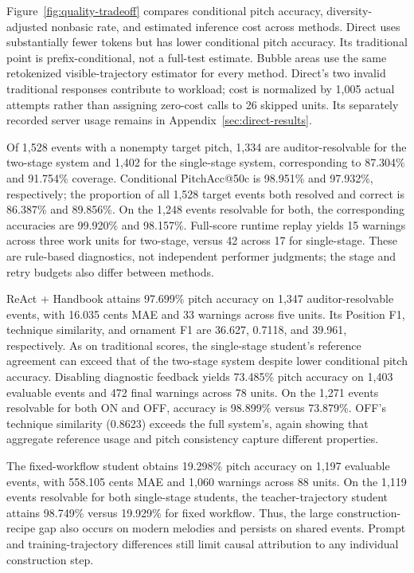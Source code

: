 Figure~\ref{fig:quality-tradeoff} compares conditional pitch accuracy, diversity-adjusted nonbasic rate, and estimated inference cost across methods. Direct uses substantially fewer tokens but has lower conditional pitch accuracy. Its traditional point is prefix-conditional, not a full-test estimate. Bubble areas use the same retokenized visible-trajectory estimator for every method. Direct's two invalid traditional responses contribute to workload; cost is normalized by 1,005 actual attempts rather than assigning zero-cost calls to 26 skipped units. Its separately recorded server usage remains in Appendix~\ref{sec:direct-results}.

Of 1,528 events with a nonempty target pitch, 1,334 are auditor-resolvable for the two-stage system and 1,402 for the single-stage system, corresponding to 87.304\% and 91.754\% coverage. Conditional PitchAcc@50c is 98.951\% and 97.932\%, respectively; the proportion of all 1,528 target events both resolved and correct is 86.387\% and 89.856\%. On the 1,248 events resolvable for both, the corresponding accuracies are 99.920\% and 98.157\%. Full-score runtime replay yields 15 warnings across three work units for two-stage, versus 42 across 17 for single-stage. These are rule-based diagnostics, not independent performer judgments; the stage and retry budgets also differ between methods.

ReAct + Handbook attains 97.699\% pitch accuracy on 1,347 auditor-resolvable events, with 16.035 cents MAE and 33 warnings across five units. Its Position F1, technique similarity, and ornament F1 are 36.627, 0.7118, and 39.961, respectively. As on traditional scores, the single-stage student's reference agreement can exceed that of the two-stage system despite lower conditional pitch accuracy. Disabling diagnostic feedback yields 73.485\% pitch accuracy on 1,403 evaluable events and 472 final warnings across 78 units. On the 1,271 events resolvable for both ON and OFF, accuracy is 98.899\% versus 73.879\%. OFF's technique similarity (0.8623) exceeds the full system's, again showing that aggregate reference usage and pitch consistency capture different properties.

The fixed-workflow student obtains 19.298\% pitch accuracy on 1,197 evaluable events, with 558.105 cents MAE and 1,060 warnings across 88 units. On the 1,119 events resolvable for both single-stage students, the teacher-trajectory student attains 98.749\% versus 19.929\% for fixed workflow. Thus, the large construction-recipe gap also occurs on modern melodies and persists on shared events. Prompt and training-trajectory differences still limit causal attribution to any individual construction step.


